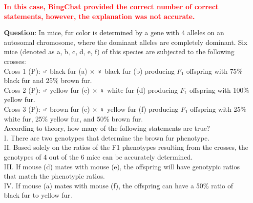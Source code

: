 \documentclass{article}
\begin{document}
{	\textcolor{red}{\textbf{In this case, BingChat provided the correct number of correct statements, however, the explanation was not accurate.}}
	\begin{mdframed}[linewidth=1pt,linecolor=red] \textbf{Question}: In mice, fur color is determined by a gene with 4 alleles on an autosomal chromosome, where the dominant alleles are completely dominant. Six mice (denoted as a, b, c, d, e, f) of this species are subjected to the following crosses: \\
		Cross 1 (P): $\male$ black fur (a) $\times$ $\female$ black fur (b) producing $F_1$ offspring with 75$\%$ black fur and 25$\%$ brown fur. \\
		Cross 2 (P): $\male$ yellow fur (c) $\times$ $\female$ white fur (d) producing $F_1$ offspring with 100$\%$ yellow fur. \\
		Cross 3 (P): $\male$ brown fur (e) $\times$ $\female$ yellow fur (f) producing $F_1$ offspring with 25$\%$ white fur, 25$\%$ yellow fur, and 50$\%$ brown fur.\\
		According to theory, how many of the following statements are true? \\
		I. There are two genotypes that determine the brown fur phenotype. \\
		II. Based solely on the ratios of the F1 phenotypes resulting from the crosses, the genotypes of 4 out of the 6 mice can be accurately determined. \\
		III. If mouse (d) mates with mouse (e), the offspring will have genotypic ratios that match the phenotypic ratios.\\ 
		IV. If mouse (a) mates with mouse (f), the offspring can have a 50$\%$ ratio of black fur to yellow fur.\\
		\begin{oneparchoices}
		\end{oneparchoices}
		

\end{mdframed}}
\end{document}
